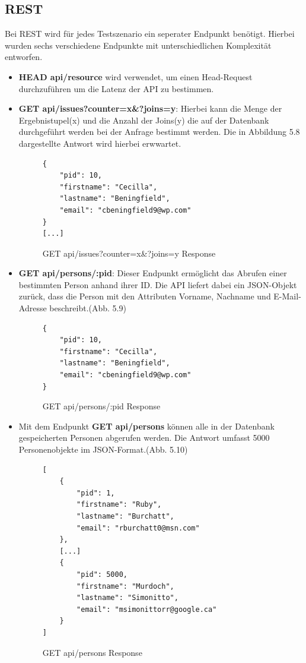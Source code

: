 \subsection{REST}
\label{sec:rest}
Bei REST wird für jedes Testszenario ein seperater Endpunkt benötigt. Hierbei wurden sechs verschiedene Endpunkte mit unterschiedlichen Komplexität entworfen.

\begin{itemize}
\item \textbf{HEAD api/resource} wird verwendet, um einen Head-Request durchzuführen um die Latenz der API zu bestimmen.
\item \textbf{GET api/issues?counter=x\&?joins=y}: Hierbei kann die Menge der Ergebnistupel(x) und die Anzahl der Joins(y) die auf der Datenbank durchgeführt werden bei der Anfrage bestimmt werden. Die in Abbildung 5.8 dargestellte Antwort wird hierbei erwwartet.
\begin{figure}[H]
\begin{center}
\begin{BVerbatim}
{
    "pid": 10,
    "firstname": "Cecilla",
    "lastname": "Beningfield",
    "email": "cbeningfield9@wp.com"
}
[...]
\end{BVerbatim}
\end{center}
\caption{GET api/issues?counter=x\&?joins=y Response}
\end{figure}


\item \textbf{GET api/persons/:pid}: Dieser Endpunkt ermöglicht das Abrufen einer bestimmten Person anhand ihrer ID. Die API liefert dabei ein JSON-Objekt zurück, dass die Person mit den Attributen Vorname, Nachname und E-Mail-Adresse beschreibt.(Abb. 5.9)
\begin{figure}[H]
\begin{center}
\begin{BVerbatim}
{
    "pid": 10,
    "firstname": "Cecilla",
    "lastname": "Beningfield",
    "email": "cbeningfield9@wp.com"
}
\end{BVerbatim}
\end{center}
\caption{GET api/persons/:pid Response}
\end{figure}

\item Mit dem Endpunkt  \textbf{GET api/persons} können alle in der Datenbank gespeicherten Personen abgerufen werden. Die Antwort umfasst 5000 Personenobjekte im JSON-Format.(Abb. 5.10)

\begin{figure}[H]
\begin{center}
\begin{BVerbatim}
[
    {
        "pid": 1,
        "firstname": "Ruby",
        "lastname": "Burchatt",
        "email": "rburchatt0@msn.com"
    },
	[...]
    {
        "pid": 5000,
        "firstname": "Murdoch",
        "lastname": "Simonitto",
        "email": "msimonittorr@google.ca"
    }
]
\end{BVerbatim}
\end{center}
\caption{GET api/persons Response}
\end{figure}


\end{itemize}
